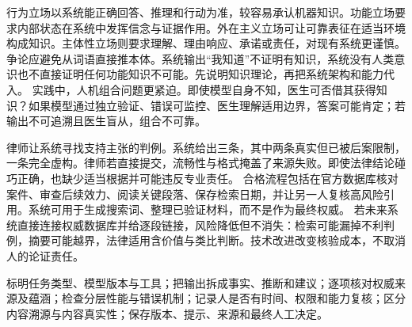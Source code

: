 行为立场以系统能正确回答、推理和行动为准，较容易承认机器知识。功能立场要求内部状态在系统中发挥信念与证据作用。外在主义立场可让可靠表征在适当环境构成知识。主体性立场则要求理解、理由响应、承诺或责任，对现有系统更谨慎。 争论应避免从词语直接推本体。系统输出“我知道”不证明有知识，系统没有人类意识也不直接证明任何功能知识不可能。先说明知识理论，再把系统架构和能力代入。 实践中，人机组合问题更紧迫。即使模型自身不知，医生可否借其获得知识？如果模型通过独立验证、错误可监控、医生理解适用边界，答案可能肯定；若输出不可追溯且医生盲从，组合不可靠。

律师让系统寻找支持主张的判例。系统给出三条，其中两条真实但已被后案限制，一条完全虚构。律师若直接提交，流畅性与格式掩盖了来源失败。即使法律结论碰巧正确，也缺少适当根据并可能违反专业责任。 合格流程包括在官方数据库核对案件、审查后续效力、阅读关键段落、保存检索日期，并让另一人复核高风险引用。系统可用于生成搜索词、整理已验证材料，而不是作为最终权威。 若未来系统直接连接权威数据库并给逐段链接，风险降低但不消失：检索可能漏掉不利判例，摘要可能越界，法律适用含价值与类比判断。技术改进改变核验成本，不取消人的论证责任。

\begin{tcolorbox}[breakable,colback=white,colframe=blue!30!black,title={人机认识链审计表},fonttitle=\bfseries]
标明任务类型、模型版本与工具；把输出拆成事实、推断和建议；逐项核对权威来源及蕴涵；检查分层性能与错误机制；记录人是否有时间、权限和能力复核；区分内容溯源与内容真实性；保存版本、提示、来源和最终人工决定。
\end{tcolorbox}
